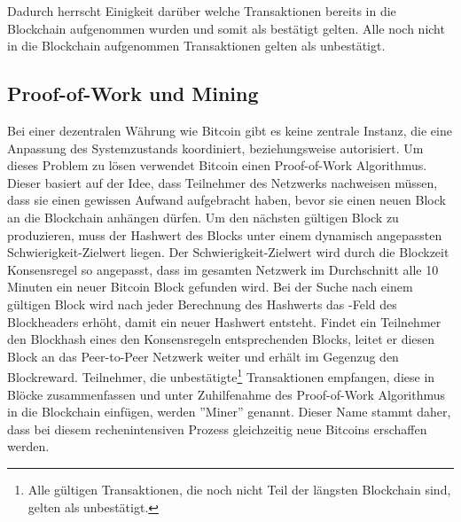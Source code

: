 \if Dadurch herrscht Einigkeit darüber welche Transaktionen bereits in die Blockchain aufgenommen wurden und somit als bestätigt gelten. Alle noch nicht in die Blockchain aufgenommen Transaktionen gelten als unbestätigt. \fi

\subsection{Proof-of-Work und Mining}
Bei einer dezentralen Währung wie Bitcoin gibt es keine zentrale Instanz, die eine Anpassung des Systemzustands koordiniert, beziehungsweise autorisiert. Um dieses Problem zu lösen verwendet Bitcoin einen Proof-of-Work Algorithmus. Dieser basiert auf der Idee, dass Teilnehmer des Netzwerks nachweisen müssen, dass sie einen gewissen Aufwand aufgebracht haben, bevor sie einen neuen Block an die Blockchain anhängen dürfen. Um den nächsten gültigen Block zu produzieren, muss der Hashwert des Blocks unter einem dynamisch angepassten Schwierigkeit-Zielwert liegen. Der Schwierigkeit-Zielwert wird durch die Blockzeit Konsensregel so angepasst, dass im gesamten Netzwerk im Durchschnitt alle 10 Minuten ein neuer Bitcoin Block gefunden wird. Bei der Suche nach einem gültigen Block wird nach jeder Berechnung des Hashwerts das -Feld des Blockheaders erhöht, damit ein neuer Hashwert entsteht. Findet ein Teilnehmer den Blockhash eines den Konsensregeln entsprechenden Blocks, leitet er diesen Block an das Peer-to-Peer Netzwerk weiter und erhält im Gegenzug den Blockreward. Teilnehmer, die unbestätigte\footnote{Alle gültigen Transaktionen, die noch nicht Teil der längsten Blockchain sind, gelten als unbestätigt.} Transaktionen empfangen, diese in Blöcke zusammenfassen und unter Zuhilfenahme des Proof-of-Work Algorithmus in die Blockchain einfügen, werden ''Miner'' genannt. Dieser Name stammt daher, dass bei diesem rechenintensiven Prozess gleichzeitig neue Bitcoins erschaffen werden.

